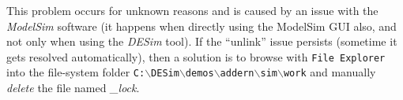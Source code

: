 \documentclass[epsfig,10pt,fullpage]{article} \addtolength{\textwidth}{1.5in}
\begin{document}
\begin{enumerate}
This problem occurs for unknown reasons and is caused by an issue with the
{\it ModelSim} software (it happens when directly using the ModelSim GUI
also, and not only when using the {\it DESim} tool). If the ``unlink'' issue
persists (sometime it gets resolved automatically), then a
solution is to browse with \texttt{File Explorer} into the file-system folder  
\texttt{C:$\backslash$DESim$\backslash$demos$\backslash$addern$\backslash$sim$\backslash$work}
and manually {\it delete} the file named {\it \_lock}.
\end{enumerate}
\end{document}
